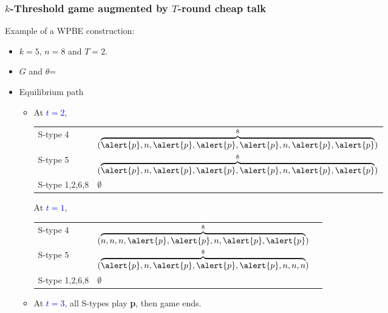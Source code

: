 \documentclass[8pt]{beamer}
\begin{document}
\begin{frame}
  \frametitle{$k$-Threshold game augmented by $T$-round cheap talk}
Example of a WPBE construction:
\begin{itemize}
\item $k=5$, $n=8$ and $T=2$.
\item $G$ and $\theta$=
\begin{center}
\end{center}
\end{itemize}

\begin{itemize}
\item Equilibrium path
\begin{itemize}
\item 
{}
{
At \textcolor{blue}{$t=2$}, 
\begin{table}[h]
\begin{tabular}{ll }
S-type 4 & $(\overbrace{\alert{p},n,\alert{p},\alert{p},\alert{p},n,\alert{p},\alert{p}}^{8})$\\
S-type 5 & $(\overbrace{\alert{p},n,\alert{p},\alert{p},\alert{p},n,\alert{p},\alert{p}}^{8})$\\
S-type 1,2,6,8 & $\emptyset$
\end{tabular}
\end{table}
}
{
At \textcolor{blue}{$t=1$}, 
\begin{table}[h]
\begin{tabular}{ll l}
S-type 4 & $(\overbrace{n,n,n,\alert{p},\alert{p},n,\alert{p},\alert{p}}^{8})$\\
S-type 5 & $(\overbrace{\alert{p},n,\alert{p},\alert{p},\alert{p},n,n,n}^{8})$ \\
S-type 1,2,6,8 & $\emptyset$
\end{tabular}
\end{table}
}

\pause
\item At \textcolor{blue}{$t=3$}, all S-types play \textbf{p}, then game ends.

\end{itemize}

\end{itemize}



\end{frame}
\end{document}
